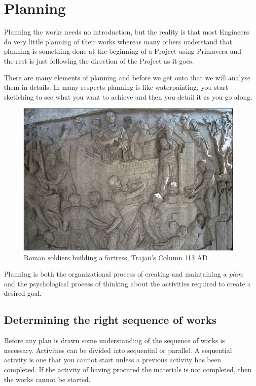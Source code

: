 \chapter{Planning}

Planning the works needs no introduction, but the reality is that most Engineers
do very little planning of their works whereas many others understand that planning
is something done at the beginning of a Project using Primavera and the rest is just following the direction of the Project as it goes.

There are many elements of planning and before we get onto that we will analyse them in details. In many respects planning is like waterpainting, you start sketiching to see what you want to achieve and then you detail it as you go along.

\begin{fullwidth}
\begin{figure}
\includegraphics[width=1.1\textwidth]{./graphics/trajan-column}
\caption{Roman soldiers building a fortress, Trajan's Column 113 AD}
\end{figure}
\end{fullwidth}

Planning is both the organizational process of creating and maintaining a \textit{plan}; and the psychological process of thinking about the activities required to create a desired goal.

\section*{Determining the right sequence of works}

Before any plan is drawn some understanding of the sequence of works
is necessary. Activities can be divided into sequential or parallel. A
sequential activity is one that you cannot start unless a previous activity
has been completed. If the activity of having procured the materials is not
completed, then the works cannot be started. 

